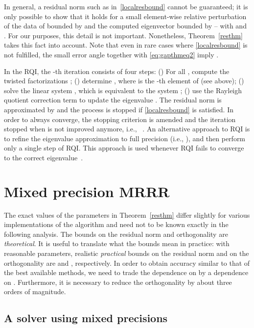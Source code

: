 \documentclass[final]{siamltex}
\begin{document}
In general, a residual norm such as in~\eqref{localresbound} cannot be guaranteed; it is only
possible to show that it holds for a small element-wise relative
perturbation of the data of  bounded by  and the computed
eigenvector  bounded by  -- with  and
. For our purposes, this
detail is not important. 
Nonetheless, Theorem~\ref{resthm} takes
this fact into account. Note that even in rare cases where \eqref{localresbound} is not
fulfilled, the small error angle together with \eqref{eq:gapthmeq2} imply
.

In the RQI, the -th iteration consists of four steps: () For all , compute the twisted factorizations ; () determine , where  is the -th element of  (see
above); () solve the linear system , which is equivalent to the system ; () use the 
Rayleigh quotient correction term to update the eigenvalue
. The residual norm is
approximated by  and the process is stopped if
\eqref{localresbound} is satisfied. 
In order to always converge, the stopping criterion is amended and the
iteration stopped when  is not improved anymore, i.e.,
~\cite{NLA:NLA493}.  
An alternative approach to RQI is to refine the eigenvalue approximation to full
precision (i.e., ), and then perform only a single step of RQI. This approach is used 
whenever RQI fails to converge to the correct eigenvalue~\cite{DesignMRRR}.



\section{Mixed precision MRRR}
\label{sec:mixedgeneral}

The exact values of the parameters in Theorem~\ref{resthm} differ
slightly for various implementations of the algorithm and need not to be
known exactly in the following analysis. The bounds on the residual norm and
orthogonality are {\it theoretical}. It is useful to translate what the bounds mean in practice: 
with reasonable parameters, realistic {\it practical} bounds on the residual
norm and on the orthogonality are  and , respectively. 
In order to obtain accuracy similar to that of the best available methods,
we need to trade the 
dependence on  by a dependence on . Furthermore, it is
necessary to reduce the orthogonality by about three orders of
magnitude.

\subsection{A solver using mixed precisions}
\end{document}
